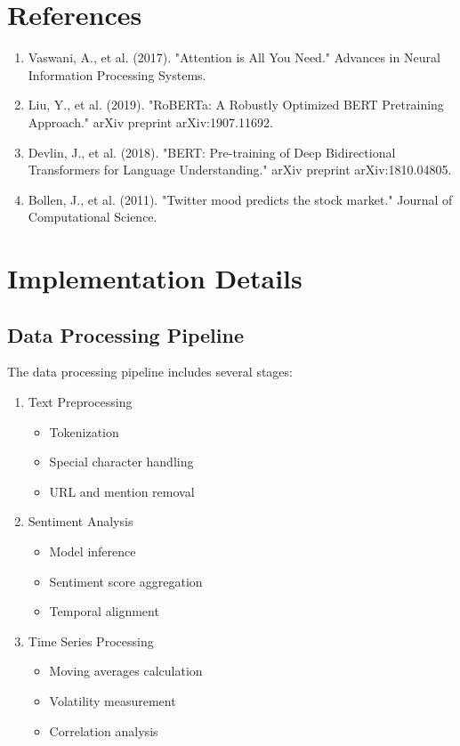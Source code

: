 \documentclass[12pt,a4paper]{report}
\begin{document}
\chapter{References}
\begin{enumerate}
    \item Vaswani, A., et al. (2017). "Attention is All You Need." Advances in Neural
          Information Processing Systems.
    \item Liu, Y., et al. (2019). "RoBERTa: A Robustly Optimized BERT Pretraining
          Approach." arXiv preprint arXiv:1907.11692.
    \item Devlin, J., et al. (2018). "BERT: Pre-training of Deep Bidirectional
          Transformers for Language Understanding." arXiv preprint arXiv:1810.04805.
    \item Bollen, J., et al. (2011). "Twitter mood predicts the stock market." Journal of Computational Science.
\end{enumerate}

\appendix
\chapter{Implementation Details}
\section{Data Processing Pipeline}
The data processing pipeline includes several stages:

\begin{enumerate}
    \item Text Preprocessing
          \begin{itemize}
              \item Tokenization
              \item Special character handling
              \item URL and mention removal
          \end{itemize}

    \item Sentiment Analysis
          \begin{itemize}
              \item Model inference
              \item Sentiment score aggregation
              \item Temporal alignment
          \end{itemize}

    \item Time Series Processing
          \begin{itemize}
              \item Moving averages calculation
              \item Volatility measurement
              \item Correlation analysis
          \end{itemize}
\end{enumerate}
\end{document}
